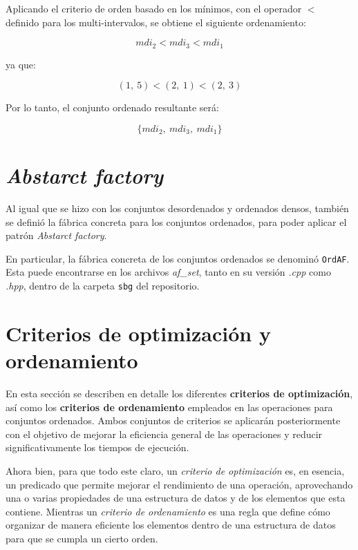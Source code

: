 Aplicando el criterio de orden basado en los mínimos, con el operador $<$ definido para los multi-intervalos, se obtiene el siguiente ordenamiento:

\begin{center}
\[
mdi_2 < mdi_3 < mdi_1
\]

ya que:

\[
(1,\ 5) < (2,\ 1) < (2,\ 3)
\]

Por lo tanto, el conjunto ordenado resultante será:

\[
\{mdi_2,\ mdi_3,\ mdi_1\}
\]
\end{center}

\section{\textit{Abstarct factory}}

Al igual que se hizo con los conjuntos desordenados y ordenados densos,
también se definió la fábrica concreta para los conjuntos ordenados, para poder aplicar el patrón \textit{Abstarct factory}. 

En particular, la fábrica concreta de los conjuntos ordenados se denominó 
\texttt{OrdAF}. Esta puede encontrarse en los archivos 
\textit{af\_set}, tanto en su versión 
\textit{.cpp} como \textit{.hpp}, dentro de la carpeta \texttt{sbg} del repositorio.

\section{Criterios de optimización y ordenamiento}\label{sec:opts}

En esta sección se describen en detalle los diferentes \textbf{criterios de optimización}, así como los \textbf{criterios de ordenamiento} empleados en las operaciones para conjuntos ordenados. Ambos conjuntos de criterios se aplicarán posteriormente con el objetivo de mejorar la eficiencia general de las operaciones y reducir significativamente los tiempos de ejecución.

Ahora bien, para que todo este claro, un \textit{criterio de optimización} es, en esencia, un predicado que permite mejorar el rendimiento de una operación, aprovechando una o varias propiedades de una estructura de datos y de los elementos que esta contiene. Mientras un \textit{criterio de ordenamiento} es una regla que define cómo organizar de manera eficiente los elementos dentro de una estructura de datos para que se cumpla un cierto orden.


